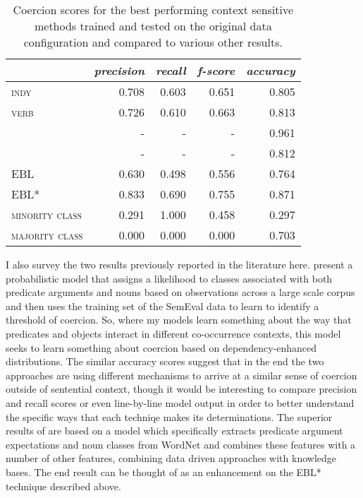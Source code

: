 \begin{table}
\begin{tabular}{lrrrr}
\hline
& \emph{precision} & \emph{recall} & \emph{f-score} & \emph{accuracy} \\
\hline
\textsc{indy} & 0.708 & 0.603 & 0.651 & 0.805 \\
\textsc{verb} & 0.726 & 0.610 & 0.663 & 0.813 \\
\cite{RobertsEA2010} & - & - & - & 0.961 & \\
\cite{RobertsEA2011} & - & - & - & 0.812 & \\
\textsc{EBL} & 0.630 & 0.498 & 0.556 & 0.764 \\
\textsc{EBL*} & 0.833 & 0.690 & 0.755 & 0.871 \\
\textsc{minority class} & 0.291 & 1.000 & 0.458 & 0.297 \\
\textsc{majority class} & 0.000 & 0.000 & 0.000 & 0.703 \\
\hline
\end{tabular}
\caption[Coercion Scores Compared Against Other Methods]{Coercion scores for the best performing context sensitive methods trained and tested on the original data configuration and compared to various other results.}
\label{tab:coerpare}
\end{table}

I also survey the two results previously reported in the literature here.  \cite{RobertsEA2011} present a probabilistic model that assigns a likelihood to classes associated with both predicate arguments and nouns based on observations across a large scale corpus and then uses the training set of the SemEval data to learn to identify a threshold of coercion.  So, where my models learn something about the way that predicates and objects interact in different co-occurrence contexts, this model seeks to learn something about coercion based on dependency-enhanced distributions.  The similar accuracy scores suggest that in the end the two approaches are using different mechanisms to arrive at a similar sense of coercion outside of sentential context, though it would be interesting to compare precision and recall scores or even line-by-line model output in order to better understand the specific ways that each techniqe makes its determinations.  The superior results of \cite{RobertsEA2010} are based on a model which specifically extracts predicate argument expectations and noun classes from WordNet and combines these features with a number of other features, combining data driven approaches with knowledge bases.  The end result can be thought of as an enhancement on the \textsc{EBL*} technique described above.

